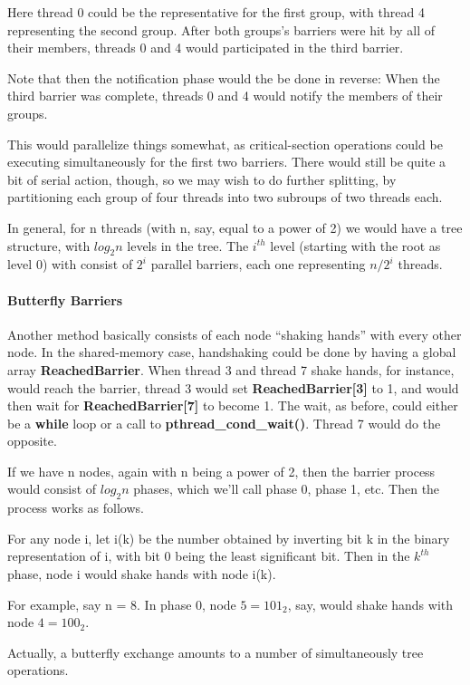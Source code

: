 Here thread 0 could be the representative for the first group, with
thread 4 representing the second group.  After both groups's barriers
were hit by all of their members, threads 0 and 4 would participated in
the third barrier.

Note that then the notification phase would the be done in reverse:
When the third barrier was complete, threads 0 and 4 would notify the
members of their groups.

This would parallelize things somewhat, as critical-section operations
could be executing simultaneously for the first two barriers.  There
would still be quite a bit of serial action, though, so we may wish to
do further splitting, by partitioning each group of four threads into
two subroups of two threads each.  

In general, for n threads (with n, say, equal to a power of 2) we would
have a tree structure, with $log_2n$ levels in the tree.  The $i^{th}$
level (starting with the root as level 0) with consist of $2^i$ parallel
barriers, each one representing $n/2^i$ threads.

\paragraph{Butterfly Barriers}

Another method basically consists of each node ``shaking hands'' with
every other node.  In the shared-memory case, handshaking could be done
by having a global array {\bf ReachedBarrier}.  When thread 3 and thread
7 shake hands, for instance, would reach the barrier, thread 3 would set
{\bf ReachedBarrier[3]} to 1, and would then wait for {\bf
ReachedBarrier[7]} to become 1.  The wait, as before, could either be a
{\bf while} loop or a call to {\bf pthread\_cond\_wait()}.  Thread 7
would do the opposite.  

If we have n nodes, again with n being a power of 2, then the barrier
process would consist of $log_2n$ phases, which we'll call phase 0,
phase 1, etc.  Then the process works as follows.

For any node i, let i(k) be the number obtained by inverting bit k in
the binary representation of i, with bit 0 being the least significant
bit.  Then in the $k^{th}$ phase, node i would shake hands with
node i(k).

For example, say n = 8.  In phase 0, node $5 = 101_2$, say, would shake
hands with node $4 = 100_2$.

Actually, a butterfly exchange amounts to a number of simultaneously
tree operations.

